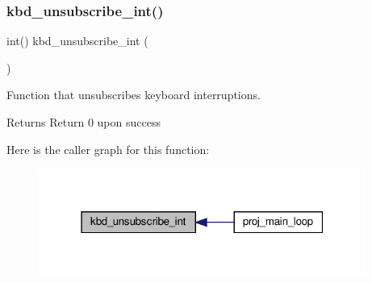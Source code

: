\subsubsection{\texorpdfstring{kbd\+\_\+unsubscribe\+\_\+int()}{kbd\_unsubscribe\_int()}}
{\footnotesize\ttfamily int() kbd\+\_\+unsubscribe\+\_\+int (\begin{DoxyParamCaption}{ }\end{DoxyParamCaption})}



Function that unsubscribes keyboard interruptions. 

\begin{DoxyReturn}{Returns}
Return 0 upon success 
\end{DoxyReturn}
Here is the caller graph for this function\+:\nopagebreak
\begin{figure}[H]
\begin{center}
\leavevmode
\includegraphics[width=304pt]{group__keyboard_gaee0a7b54ee426fade9c780418d110fe0_icgraph}
\end{center}
\end{figure}
